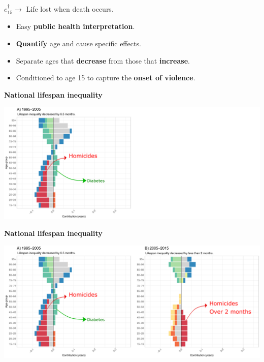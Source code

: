 \documentclass[xcolor={dvipsnames}]{beamer}
\begin{document}
\begin{frame}

\Large{
	\textbf{$e^{\dagger}_{15}\longrightarrow  $} Life lost when death occurs.

	\begin{itemize}
		\item Easy \textbf{public health interpretation}.
		\pause
		\item \textbf{Quantify} age and cause specific effects.
		\pause
		\item Separate ages that \textbf{decrease} from those that \textbf{increase}.
		\pause
		\item Conditioned to age 15 to capture the \textbf{onset of violence}.
	\end{itemize}

}
\end{frame}



\begin{frame}
	\begin{center}
		\Large{\textbf{National lifespan inequality}}
	\end{center}

	\hspace*{-1cm}   
	\includegraphics[scale=.31]{Figures/Figure_2_2}
	
\end{frame}


\begin{frame}
	\begin{center}
		\Large{\textbf{National lifespan inequality}}
	\end{center}

	\hspace*{-1cm}   
	\includegraphics[scale=.31]{Figures/Figure_2}	

\end{frame}
\end{document}
